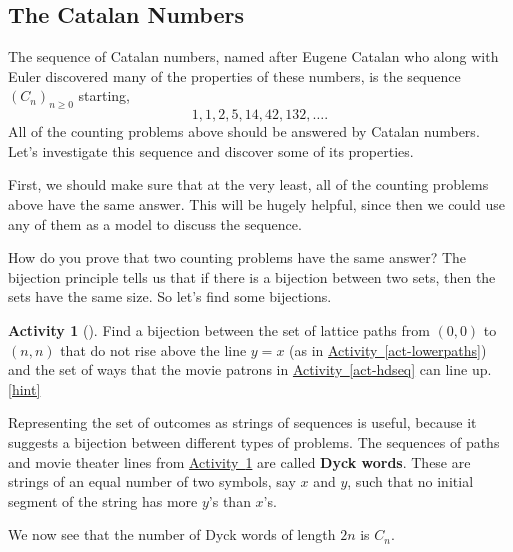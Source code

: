 \documentclass[10pt,]{book}
\newcommand{\terminology}[1]{\textbf{#1}}
\theoremstyle{plain}
\theoremstyle{definition}
\theoremstyle{definition}
\theoremstyle{definition}
\newtheorem{activity}[project]{Activity}
\numberwithin{equation}{chapter}
\begin{document}
\subsection[{The Catalan Numbers}]{The Catalan Numbers}\label{subsec-catalanseq}
\hypertarget{p-1005}{}%
The sequence of Catalan numbers, named after Eugene Catalan who along with Euler discovered many of the properties of these numbers, is the sequence \((C_n)_{n \ge 0}\) starting,%
\begin{equation*}
1, 1, 2, 5, 14, 42, 132, \ldots\text{.}
\end{equation*}
All of the counting problems above should be answered by Catalan numbers.  Let's investigate this sequence and discover some of its properties.%
\par
\hypertarget{p-1006}{}%
First, we should make sure that at the very least, all of the counting problems above have the same answer.  This will be hugely helpful, since then we could use any of them as a model to discuss the sequence.%
\par
\hypertarget{p-1007}{}%
How do you prove that two counting problems have the same answer?  The bijection principle tells us that if there is a bijection between two sets, then the sets have the same size.  So let's find some bijections.%
\begin{activity}[]\label{act-pathshdseq}
\hypertarget{p-1008}{}%
Find a bijection between the set of lattice paths from \((0,0)\) to \((n,n)\) that do not rise above the line \(y = x\) (as in \hyperref[act-lowerpaths]{Activity~\ref{act-lowerpaths}}) and the set of ways that the movie patrons in \hyperref[act-hdseq]{Activity~\ref{act-hdseq}} can line up.%
\hfill{\tiny\hyperlink{a-178}{[hint]}\hypertarget{q-178}{}}\end{activity}
\hypertarget{p-1010}{}%
Representing the set of outcomes as strings of sequences is useful, because it suggests a bijection between different types of problems.  The sequences of paths and movie theater lines from \hyperref[act-pathshdseq]{Activity~\ref{act-pathshdseq}} are called \terminology{Dyck words}.  These are strings of an equal number of two symbols, say \(x\) and \(y\), such that no initial segment of the string has more \(y\)'s than \(x\)'s.%
\par
\hypertarget{p-1011}{}%
We now see that the number of Dyck words of length \(2n\) is \(C_n\).%
\end{document}
